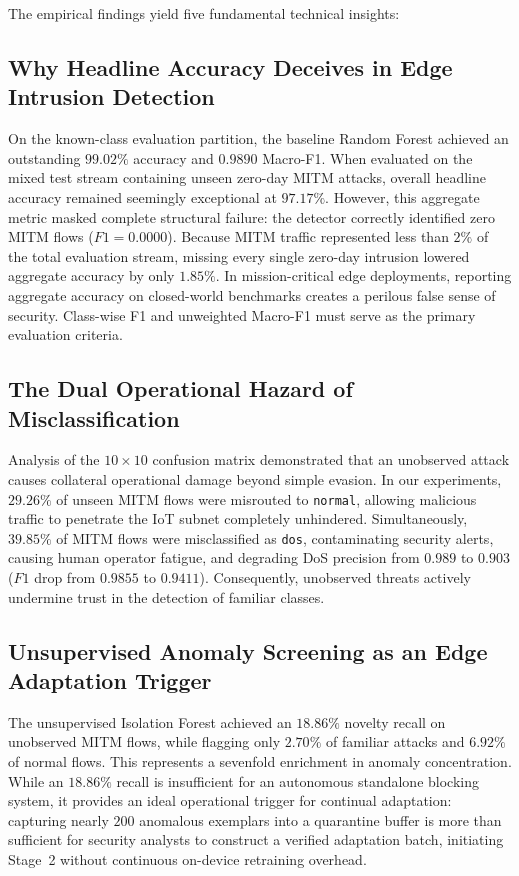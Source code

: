 The empirical findings yield five fundamental technical insights:

\subsection{Why Headline Accuracy Deceives in Edge Intrusion Detection}
On the known-class evaluation partition, the baseline Random Forest achieved an outstanding $99.02\%$ accuracy and $0.9890$ Macro-F1. When evaluated on the mixed test stream containing unseen zero-day MITM attacks, overall headline accuracy remained seemingly exceptional at $97.17\%$. However, this aggregate metric masked complete structural failure: the detector correctly identified zero MITM flows ($F1 = 0.0000$). Because MITM traffic represented less than $2\%$ of the total evaluation stream, missing every single zero-day intrusion lowered aggregate accuracy by only $1.85\%$. In mission-critical edge deployments, reporting aggregate accuracy on closed-world benchmarks creates a perilous false sense of security. Class-wise F1 and unweighted Macro-F1 must serve as the primary evaluation criteria.

\subsection{The Dual Operational Hazard of Misclassification}
Analysis of the $10 \times 10$ confusion matrix demonstrated that an unobserved attack causes collateral operational damage beyond simple evasion. In our experiments, $29.26\%$ of unseen MITM flows were misrouted to \texttt{normal}, allowing malicious traffic to penetrate the IoT subnet completely unhindered. Simultaneously, $39.85\%$ of MITM flows were misclassified as \texttt{dos}, contaminating security alerts, causing human operator fatigue, and degrading DoS precision from $0.989$ to $0.903$ ($F1$ drop from $0.9855$ to $0.9411$). Consequently, unobserved threats actively undermine trust in the detection of familiar classes.

\subsection{Unsupervised Anomaly Screening as an Edge Adaptation Trigger}
The unsupervised Isolation Forest achieved an $18.86\%$ novelty recall on unobserved MITM flows, while flagging only $2.70\%$ of familiar attacks and $6.92\%$ of normal flows. This represents a sevenfold enrichment in anomaly concentration. While an $18.86\%$ recall is insufficient for an autonomous standalone blocking system, it provides an ideal operational trigger for continual adaptation: capturing nearly $200$ anomalous exemplars into a quarantine buffer is more than sufficient for security analysts to construct a verified adaptation batch, initiating Stage~2 without continuous on-device retraining overhead.

